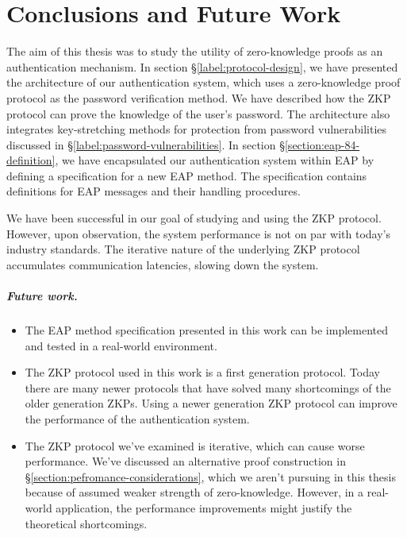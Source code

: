 \chapter{Conclusions and Future Work}
The aim of this thesis was to study the utility of zero-knowledge proofs as an authentication mechanism.
In section \S\ref{label:protocol-design}, we have presented the architecture of our authentication system, which uses a zero-knowledge proof protocol as the password verification method.
We have described how the ZKP protocol can prove the knowledge of the user's password. The architecture also integrates key-stretching methods for protection from password vulnerabilities discussed in \S\ref{label:password-vulnerabilities}.
In section \S\ref{section:eap-84-definition}, we have encapsulated our authentication system within EAP by defining a specification for a new EAP method.
The specification contains definitions for EAP messages and their handling procedures.

We have been successful in our goal of studying and using the ZKP protocol.
However, upon observation, the system performance is not on par with today's industry standards. The iterative nature of the underlying ZKP protocol accumulates communication latencies, slowing down the system.

\paragraph{Future work.}

\begin{itemize}
	\item The EAP method specification presented in this work can be implemented and tested in a real-world environment.
	\item The ZKP protocol used in this work is a first generation protocol. Today there are many newer protocols that have solved many shortcomings of the older generation ZKPs. Using a newer generation ZKP protocol can improve the performance of the authentication system.
	\item The ZKP protocol we've examined is iterative, which can cause worse performance. We've discussed an alternative proof construction in \S\ref{section:pefromance-considerations}, which we aren't pursuing in this thesis because of assumed weaker strength of zero-knowledge. However, in a real-world application, the performance improvements might justify the theoretical shortcomings.
\end{itemize}